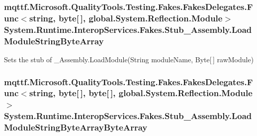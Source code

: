 \hypertarget{class_system_1_1_runtime_1_1_interop_services_1_1_fakes_1_1_stub___assembly_aaa158f016d116f79373e0d3bb207452a}{
\subsubsection[{Load\-Module\-String\-Byte\-Array}]{\setlength{\rightskip}{0pt plus 5cm}mqttf.\-Microsoft.\-Quality\-Tools.\-Testing.\-Fakes.\-Fakes\-Delegates.\-Func$<$string, byte\mbox{[}$\,$\mbox{]}, global.\-System.\-Reflection.\-Module$>$ System.\-Runtime.\-Interop\-Services.\-Fakes.\-Stub\-\_\-\-Assembly.\-Load\-Module\-String\-Byte\-Array}}\label{class_system_1_1_runtime_1_1_interop_services_1_1_fakes_1_1_stub___assembly_aaa158f016d116f79373e0d3bb207452a}


Sets the stub of \-\_\-\-Assembly.\-Load\-Module(\-String module\-Name, Byte\mbox{[}$\,$\mbox{]} raw\-Module)

\hypertarget{class_system_1_1_runtime_1_1_interop_services_1_1_fakes_1_1_stub___assembly_a098ab737845b12165053703010a6a194}{
\subsubsection[{Load\-Module\-String\-Byte\-Array\-Byte\-Array}]{\setlength{\rightskip}{0pt plus 5cm}mqttf.\-Microsoft.\-Quality\-Tools.\-Testing.\-Fakes.\-Fakes\-Delegates.\-Func$<$string, byte\mbox{[}$\,$\mbox{]}, byte\mbox{[}$\,$\mbox{]}, global.\-System.\-Reflection.\-Module$>$ System.\-Runtime.\-Interop\-Services.\-Fakes.\-Stub\-\_\-\-Assembly.\-Load\-Module\-String\-Byte\-Array\-Byte\-Array}}\label{class_system_1_1_runtime_1_1_interop_services_1_1_fakes_1_1_stub___assembly_a098ab737845b12165053703010a6a194}


